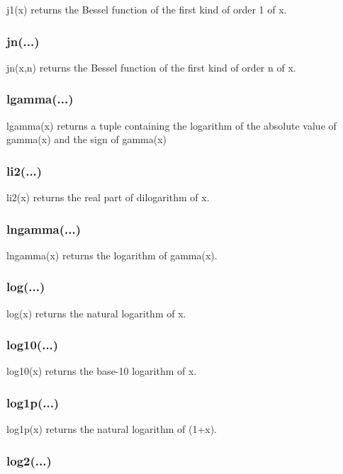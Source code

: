 j1(x) returns the Bessel function of the first kind of order 1 of x.

\subsubsection{jn(...)}

jn(x,n) returns the Bessel function of the first kind of order n of x.

\subsubsection{lgamma(...)}

lgamma(x) returns a tuple containing the logarithm of the absolute value of gamma(x) and the
sign of gamma(x)

\subsubsection{li2(...)}

li2(x) returns the real part of dilogarithm of x.

\subsubsection{lngamma(...)}

lngamma(x) returns the logarithm of gamma(x).

\subsubsection{log(...)}

log(x) returns the natural logarithm of x.

\subsubsection{log10(...)}

log10(x) returns the base-10 logarithm of x.

\subsubsection{log1p(...)}

log1p(x) returns the natural logarithm of (1+x).

\subsubsection{log2(...)}

